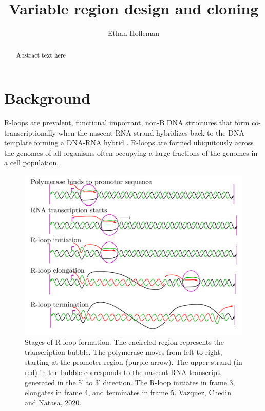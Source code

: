 \documentclass[11pt]{article}
\author{Ethan Holleman}
\title{Variable region design and cloning}
\begin{document}
\maketitle
\begin{abstract}
	Abstract text here
\end{abstract}

\tableofcontents
\pagebreak

\section{Background}

R-loops are prevalent, functional important, non-B DNA structures that form co-transcriptionally when the nascent RNA strand hybridizes back to the DNA template forming a DNA-RNA hybrid \cite{chedin_nascent_2016}. R-loops are formed ubiquitously across the genomes of all organisms often occupying a large fractions of the genomes in a cell population. 

\begin{figure}[H]
	\includegraphics[width=12cm]{images/r-loops/rloop_stages.png}
	\centering
	\caption{Stages of R-loop formation. The encircled region represents the transcription bubble. The polymerase moves from left to right, starting at the promoter region (purple arrow). The upper strand (in red) in the bubble corresponds to the nascent RNA transcript, generated in the 5' to 3' direction. The R-loop initiates in frame 3, elongates in frame 4, and terminates in frame 5. Vazquez, Chedin and Natasa, 2020.}
	\label{fig:1}
\end{figure}
\end{document}
